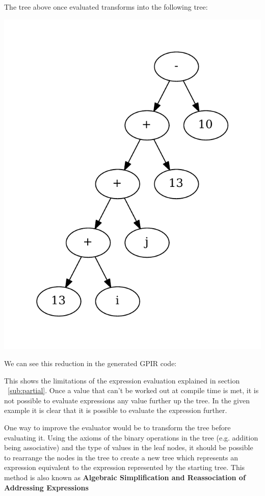 The tree above once evaluated transforms into the following tree: 

\begin{center}
\includegraphics[scale=0.5]{graphs/futureTree.pdf}
\end{center}

We can see this reduction in the generated GPIR code:



This shows the limitations of the expression evaluation explained in section ~\ref{sub:partial}.
Once a value that can't be worked out at compile time is met, it is not possible
to evaluate expressions any value further up the tree. In the given example
it is clear that it is possible to evaluate the expression further.

One way to improve the evaluator would be to transform the tree before evaluating it.
Using the axioms of the binary operations in the tree (e.g. addition being associative)
and the type of values in the leaf nodes, it should be possible to rearrange the nodes in the 
tree to create a new tree which represents an expression equivalent to the expression
represented by the starting tree. This method is also known as \textbf{Algebraic Simplification and Reassociation
of Addressing Expressions}\cite[Section~12.3]{optimize}

